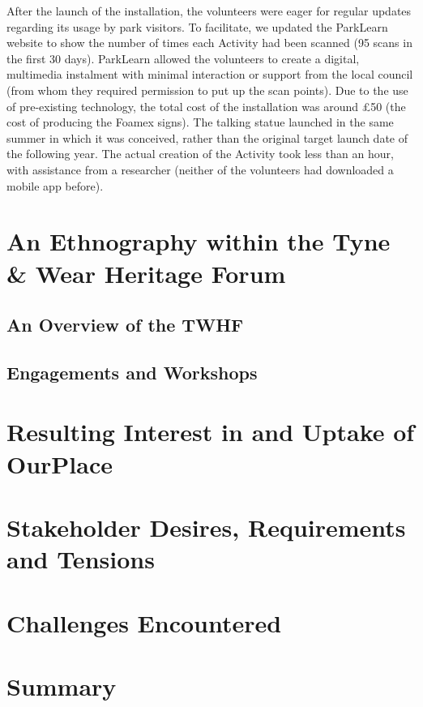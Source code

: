 After the launch of the installation, the volunteers were eager for regular
updates regarding its usage by park visitors. To facilitate, we updated the
ParkLearn website to show the number of times each Activity had been scanned (95
scans in the first 30 days). ParkLearn allowed the volunteers to create a
digital, multimedia instalment with minimal interaction or support from the
local council (from whom they required permission to put up the scan points).
Due to the use of pre-existing technology, the total cost of the installation
was around £50 (the cost of producing the Foamex signs). The talking statue
launched in the same summer in which it was conceived, rather than the original
target launch date of the following year. The actual creation of the Activity
took less than an hour, with assistance from a researcher (neither of the
volunteers had downloaded a mobile app before).

\section{An Ethnography within the Tyne \& Wear Heritage Forum}

\subsection{An Overview of the TWHF}

\subsection{Engagements and Workshops}

\section{Resulting Interest in and Uptake of OurPlace}

\section{Stakeholder Desires, Requirements and Tensions}

\section{Challenges Encountered}

\section{Summary}